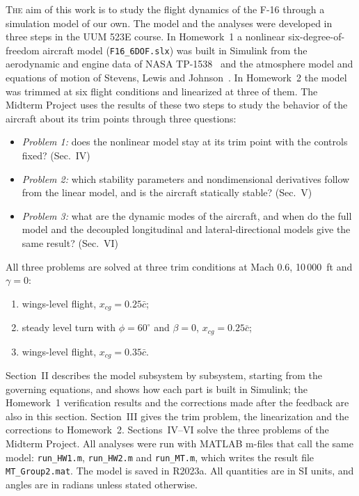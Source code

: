 \documentclass[conf]{new-aiaa}
\begin{document}
\lettrine{T}{he} aim of this work is to study the flight dynamics of the F-16 through a simulation model of our own. The model and the analyses were developed in three steps in the UUM 523E course. In Homework~1 a nonlinear six-degree-of-freedom aircraft model (\texttt{F16\_6DOF.slx}) was built in Simulink from the aerodynamic and engine data of NASA TP-1538~\cite{tp1538} and the atmosphere model and equations of motion of Stevens, Lewis and Johnson~\cite{slj}. In Homework~2 the model was trimmed at six flight conditions and linearized at three of them. The Midterm Project uses the results of these two steps to study the behavior of the aircraft about its trim points through three questions:
\begin{itemize}
\item \emph{Problem 1:} does the nonlinear model stay at its trim point with the controls fixed? (Sec.~IV)
\item \emph{Problem 2:} which stability parameters and nondimensional derivatives follow from the linear model, and is the aircraft statically stable? (Sec.~V)
\item \emph{Problem 3:} what are the dynamic modes of the aircraft, and when do the full model and the decoupled longitudinal and lateral-directional models give the same result? (Sec.~VI)
\end{itemize}
All three problems are solved at three trim conditions at Mach 0.6, 10\,000~ft and $\gamma=0$:
\begin{enumerate}
\item[i.] wings-level flight, $x_{cg}=0.25\bar c$;
\item[ii.] steady level turn with $\phi=60^\circ$ and $\beta=0$, $x_{cg}=0.25\bar c$;
\item[iii.] wings-level flight, $x_{cg}=0.35\bar c$.
\end{enumerate}

Section~II describes the model subsystem by subsystem, starting from the governing equations, and shows how each part is built in Simulink; the Homework~1 verification results and the corrections made after the feedback are also in this section. Section~III gives the trim problem, the linearization and the corrections to Homework~2. Sections~IV--VI solve the three problems of the Midterm Project. All analyses were run with MATLAB m-files that call the same model: \texttt{run\_HW1.m}, \texttt{run\_HW2.m} and \texttt{run\_MT.m}, which writes the result file \texttt{MT\_Group2.mat}. The model is saved in R2023a. All quantities are in SI units, and angles are in radians unless stated otherwise.
\end{document}
